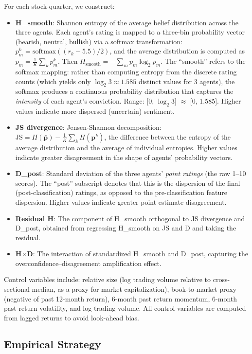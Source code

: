 \documentclass[12pt,a4paper]{article}
\begin{document}
For each stock-quarter, we construct:
\begin{itemize}
\item \textbf{H\_smooth}: Shannon entropy of the average belief distribution across the three agents. Each agent's rating is mapped to a three-bin probability vector (bearish, neutral, bullish) via a softmax transformation: $p_m^k = \text{softmax}((r_k - 5.5)/2)$, and the average distribution is computed as $\bar{p}_m = \frac{1}{K}\sum_k p_m^k$. Then $H_{\text{smooth}} = -\sum_{m} \bar{p}_m \log_2 \bar{p}_m$. The ``smooth'' refers to the softmax mapping: rather than computing entropy from the discrete rating counts (which yields only $\log_2 3 \approx 1.585$ distinct values for 3 agents), the softmax produces a continuous probability distribution that captures the \textit{intensity} of each agent's conviction. Range: [0, $\log_2 3$] $\approx$ [0, 1.585]. Higher values indicate more dispersed (uncertain) sentiment.
\item \textbf{JS divergence}: Jensen-Shannon decomposition: $\text{JS} = H(\bar{\mathbf{p}}) - \frac{1}{K}\sum_k H(\mathbf{p}^k)$, the difference between the entropy of the average distribution and the average of individual entropies. Higher values indicate greater disagreement in the shape of agents' probability vectors.
\item \textbf{D\_post}: Standard deviation of the three agents' \textit{point ratings} (the raw 1--10 scores). The ``post'' subscript denotes that this is the dispersion of the final (post-classification) ratings, as opposed to the pre-classification feature dispersion. Higher values indicate greater point-estimate disagreement.
\item \textbf{Residual H}: The component of H\_smooth orthogonal to JS divergence and D\_post, obtained from regressing H\_smooth on JS and D and taking the residual.
\item \textbf{H$\times$D}: The interaction of standardized H\_smooth and D\_post, capturing the overconfidence--disagreement amplification effect.
\end{itemize}

Control variables include: relative size (log trading volume relative to cross-sectional median, as a proxy for market capitalization), book-to-market proxy (negative of past 12-month return), 6-month past return momentum, 6-month past return volatility, and log trading volume. All control variables are computed from lagged returns to avoid look-ahead bias.

\subsection{Empirical Strategy}
\end{document}
